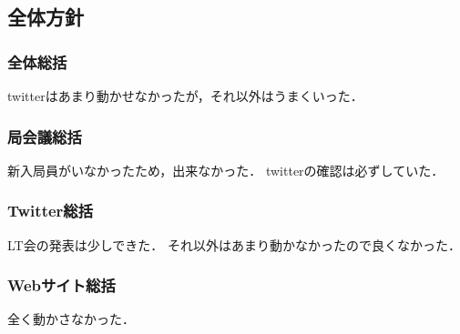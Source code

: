 \subsection*{全体方針}


\subsubsection*{全体総括}

twitterはあまり動かせなかったが，それ以外はうまくいった．

\subsubsection*{局会議総括}

新入局員がいなかったため，出来なかった．
twitterの確認は必ずしていた．

\subsubsection*{Twitter総括}

LT会の発表は少しできた．
それ以外はあまり動かなかったので良くなかった．

\subsubsection*{Webサイト総括}

全く動かさなかった．

